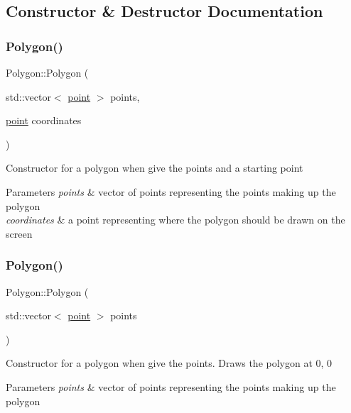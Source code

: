 \subsection{Constructor \& Destructor Documentation}
\mbox{\label{class_polygon_a7c9801ab8183848cda1a9e4e355973cc}} 
\subsubsection{\texorpdfstring{Polygon()}{Polygon()}\hspace{0.1cm}{\footnotesize\ttfamily [1/3]}}
{\footnotesize\ttfamily Polygon\+::\+Polygon (\begin{DoxyParamCaption}\item[{std\+::vector$<$ \mbox{\hyperlink{structpoint}{point}} $>$}]{points,  }\item[{\mbox{\hyperlink{structpoint}{point}}}]{coordinates }\end{DoxyParamCaption})}

Constructor for a polygon when give the points and a starting point 
\begin{DoxyParams}{Parameters}
{\em points} & vector of points representing the points making up the polygon \\
\hline
{\em coordinates} & a point representing where the polygon should be drawn on the screen \\
\hline
\end{DoxyParams}
\mbox{\label{class_polygon_a84c5ba9b7d4fbbfd85e2485712d282d8}} 
\subsubsection{\texorpdfstring{Polygon()}{Polygon()}\hspace{0.1cm}{\footnotesize\ttfamily [2/3]}}
{\footnotesize\ttfamily Polygon\+::\+Polygon (\begin{DoxyParamCaption}\item[{std\+::vector$<$ \mbox{\hyperlink{structpoint}{point}} $>$}]{points }\end{DoxyParamCaption})}

Constructor for a polygon when give the points. Draws the polygon at 0, 0 
\begin{DoxyParams}{Parameters}
{\em points} & vector of points representing the points making up the polygon \\
\hline
\end{DoxyParams}
\mbox{\label{class_polygon_ac183e712f8be1e13f1c9d5b4d4512ead}} 
